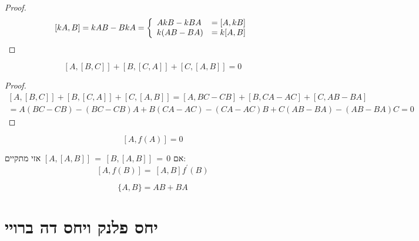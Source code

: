 \documentclass{tstextbook}
\begin{document}
\begin{proof}
$$[k A,B]=k A B-B k A={\left\{\begin{array}{l l}{A k B-k B A}&{=[A,k B]}\\ {k(A B-B A)}&{=k[A,B]}\end{array}\right.}$$

\end{proof}
\begin{proposition}
$$[A,[B,C]]+[B,[C,A]]+[C,[A,B]]=0$$

\end{proposition}
\begin{proof}
$$\begin{array}{l}{{[A,[B,C]]+[B,[C,A]]+[C,[A,B]]=[A,B C-C B]+[B,C A-A C]+[C,A B-B A]}}\\ {{=A(B C-C B)-(B C-C B)A+B(C A-A C)-(C A-A C)B+C(A B-B A)-(A B-B A)C=0}}\end{array}$$

\end{proof}
\begin{proposition}
$$[A,f(A)]=0$$

\end{proposition}
אם \([A,[A,B]]\,=\,[B,[A,B]]\,=\,0\) אזי מתקיים:
$$\left[A,f\left(B\right)\right]=\ \left[A,B\right]f^{\prime}\left(B\right)$$

\begin{definition}
$$\{A,B\}=AB+BA$$

\end{definition}
\section{יחס פלנק ויחס דה ברויי}
\end{document}
